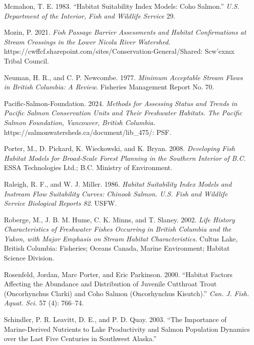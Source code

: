 \documentclass[
  letterpaper,
  DIV=11,
  numbers=noendperiod]{scrreprt}
\newlength{\cslhangindent}
\newlength{\cslentryspacingunit} %
\newenvironment{CSLReferences}[2] %
 {%
  \setlength{\parindent}{0pt}
  \ifodd #1
  \let\oldpar\par
  \def\par{\hangindent=\cslhangindent\oldpar}
  \fi
  \setlength{\parskip}{#2\cslentryspacingunit}
 }%
 {}
\begin{document}
\begin{CSLReferences}{1}{0}
\leavevmode{}%
Mcmahon, T. E. 1983. {``Habitat Suitability Index Models: Coho
Salmon.''} \emph{{U.S}. Department of the Interior, Fish and Wildlife
Service} 29.

\leavevmode{}%
Mozin, P. 2021. \emph{Fish Passage Barrier Assessments and Habitat
Confirmations at Stream Crossings in the Lower Nicola River Watershed}.
https://cwffcf.sharepoint.com/sites/Conservation-General/Shared:
Scw'exmx Tribal Council.

\leavevmode{}%
Neuman, H. R., and C. P. Newcombe. 1977. \emph{Minimum Acceptable Stream
Flows in British Columbia: A Review}. Fisheries Management Report No.
70.

\leavevmode{}%
Pacific-Salmon-Foundation. 2024. \emph{Methods for Assessing Status and
Trends in Pacific Salmon Conservation Units and Their Freshwater
Habitats. The Pacific Salmon Foundation, Vancouver, British Columbia.}
https://salmonwatersheds.ca/document/lib\_475/: PSF.

\leavevmode{}%
Porter, M., D. Pickard, K. Wieckowski, and K. Bryan. 2008.
\emph{Developing Fish Habitat Models for {Broad-Scale} Forest Planning
in the Southern Interior of {B.C}.} {ESSA} Technologies Ltd.; {B.C}.
Ministry of Environment.

\leavevmode{}%
Raleigh, R. F., and W. J. Miller. 1986. \emph{Habitat Suitability Index
Models and Instream Flow Suitability Curves: Chinook Salmon. {U.S}. Fish
and Wildlife Service Biological Reports 82}. USFW.

\leavevmode{}%
Roberge, M., J. B. M. Hume, C. K. Minns, and T. Slaney. 2002. \emph{Life
History Characteristics of Freshwater Fishes Occurring in British
Columbia and the Yukon, with Major Emphasis on Stream Habitat
Characteristics.} Cultus Lake, British Columbia: Fisheries; Oceans
Canada, Marine Environment; Habitat Science Division.

\leavevmode{}%
Rosenfeld, Jordan, Marc Porter, and Eric Parkinson. 2000. {``Habitat
Factors Affecting the Abundance and Distribution of Juvenile Cutthroat
Trout (Oncorhynchus Clarki) and Coho Salmon (Oncorhynchus Kisutch).''}
\emph{Can. J. Fish. Aquat. Sci.} 57 (4): 766--74.

\leavevmode{}%
Schindler, P. R. Leavitt, D. E., and P. D. Quay. 2003. {``The Importance
of Marine-Derived Nutrients to Lake Productivity and Salmon Population
Dynamics over the Last Five Centuries in Southwest Alaska.''}


\end{CSLReferences}
\end{document}

